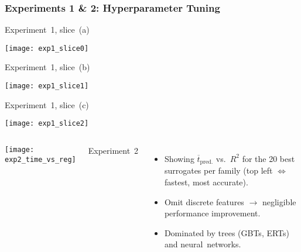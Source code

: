 \begin{frame}
	\frametitle{Experiments 1 \& 2: Hyperparameter Tuning}

	\begin{minipage}{0.32\textwidth}
		\begin{center}
			\footnotesize
			\hspace{5pt} Experiment~1, slice~(a)
			\vspace{-10pt}
		\end{center}
		\texttt{[image: exp1\_slice0]}
	\end{minipage}
	\begin{minipage}{0.32\textwidth}
		\begin{center}
			\footnotesize
			\hspace{5pt} Experiment~1, slice~(b)
			\vspace{-10pt}
		\end{center}
		\texttt{[image: exp1\_slice1]}
	\end{minipage}
	\begin{minipage}{0.32\textwidth}
		\begin{center}
			\footnotesize
			\hspace{5pt} Experiment~1, slice~(c)
			\vspace{-10pt}
		\end{center}
		\texttt{[image: exp1\_slice2]}
	\end{minipage}

	\begin{columns}
		\texttt{[image: exp2\_time\_vs\_reg]}
		\begin{center}
			\footnotesize
			\vspace{-10pt}
			\hspace{20pt} Experiment~2
		\end{center}

		\begin{itemize}
			\item
				Showing $\overline{t}_\text{pred.}$ vs.~$R^2$ for the 20 best
				surrogates per family (top left $\Leftrightarrow$ fastest, most accurate).
			\item
				Omit discrete features $\rightarrow$ negligible
				performance improvement.
			\item
				Dominated by \alert{trees} (GBTs, ERTs) and
				\alert{neural~networks}.
		\end{itemize}
	\end{columns}

\end{frame}

